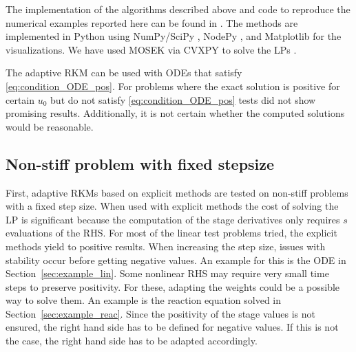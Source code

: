 \documentclass[a4paper]{article}
\numberwithin{equation}{section}
\theoremstyle{plain}
\theoremstyle{definition}
\numberwithin{theorem}{section}
\newcommand{\1}{\mathbbm{1}}
\newcommand{\todo}[1]{{\Large{\color{red}{#1}}}}
\begin{document}
The implementation of the algorithms described above and code to
reproduce the numerical examples reported here can be found in
\cite{repository}. \todo{TODO: New repository with DOI} %
The methods are implemented in Python using NumPy/SciPy
\cite{virtanen2020scipy}, NodePy \cite{nodepy08}, and
Matplotlib \cite{hunter2007matplotlib} for the visualizations.
We have used MOSEK \cite{mosek} via CVXPY to solve the LPs
\cite{cvxpy, cvxpy_rewriting}.

The adaptive RKM can be used with ODEs that satisfy \eqref{eq:condition_ODE_pos}.
For problems where the exact solution is positive for certain $u_0$ but do not satisfy \eqref{eq:condition_ODE_pos} tests did not show promising results. Additionally, it is not certain whether the computed solutions would be reasonable.


\subsection{Non-stiff problem with fixed stepsize}\label{sec:Ex_expl}
First, adaptive RKMs based on explicit methods are tested on non-stiff problems with a fixed step size.
When used with explicit methods the cost of solving the LP is significant because the computation of the stage derivatives only requires $s$ evaluations of the RHS.
For most of the linear test problems tried, the explicit methods yield to positive results.
When increasing the step size, issues with stability occur before getting negative values.
An example for this is the ODE in Section~\ref{sec:example_lin}.
Some nonlinear RHS may require very small time steps to preserve positivity.
For these, adapting the weights could be a possible way to solve them.
An example is the reaction equation solved in Section~\ref{sec:example_reac}.
Since the positivity of the stage values is not ensured, the right hand side has to be defined for negative values. If this is not the case, the right hand side has to be adapted accordingly.
\end{document}

